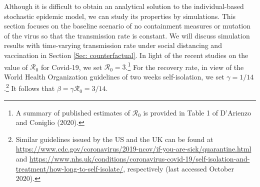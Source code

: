 \documentclass[12pt]{article}
\begin{document}
Although it is difficult to obtain an analytical solution to the
individual-based stochastic epidemic model, we can study its properties by
simulations. This section focuses on the baseline scenario of no containment
measures or mutation of the virus so that the transmission rate is constant.
We will discuss simulation results with time-varying transmission rate under
social distancing and vaccination in Section \ref{Sec: counterfactual}. In
light of the recent studies on the value of $\mathcal{R}_{0}$ for Covid-19, we
set $\mathcal{R}_{0}=3$.\footnote{A summary of published estimates of
$\mathcal{R}_{0}$ is provided in Table 1 of D'Arienzo and Coniglio (2020).}
For the recovery rate, in view of the World Health Organization guidelines of
two weeks self-isolation, we set $\gamma=1/14$.\footnote{\label{gamma14}%
Similar guidelines issued by the US and the UK can be found at
\url{https://www.cdc.gov/coronavirus/2019-ncov/if-you-are-sick/quarantine.html}
and
\url{https://www.nhs.uk/conditions/coronavirus-covid-19/self-isolation-and-treatment/how-long-to-self-isolate/},
respectively (last accessed October 2020).} It follows that $\beta
=\gamma\mathcal{R}_{0}=3/14.$
\end{document}
